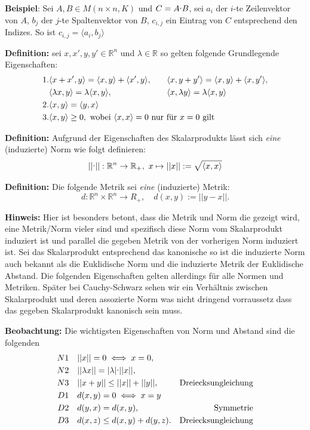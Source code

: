 \documentclass{article}
\let\oldcdot\cdot
\renewcommand{\cdot}{\raisebox{0.1ex}{$\oldcdot$}}
\begin{document}
\textbf{Beispiel}: Sei $A,B\in M(n\times n,K)$ und $C=A\cdot B$, sei $a_i$ der
$i$-te Zeilenvektor von $A$, $b_j$ der $j$-te Spaltenvektor von $B$, $c_{i,j}$
ein Eintrag von $C$ entsprechend den Indizes. So ist $c_{i,j}=\langle
a_i,b_j\rangle$

\textbf{Definition: } sei $x,x',y,y'\in\mathbb{R}^n$ und $\lambda\in\mathbb{R}$
so gelten folgende Grundlegende Eigenschaften:
\begin{alignat*}{2}
	1.&\langle x+x',y\rangle = \langle x,y\rangle + \langle
	x',y\rangle,\quad&&
	\langle x,y+y'\rangle = \langle x,y\rangle + \langle x,y'\rangle,\\
	&\langle \lambda x,y\rangle=\lambda\langle x,y\rangle,&&
	\langle x,\lambda y\rangle=\lambda\langle x,y\rangle\\
	2.&\langle x,y\rangle = \langle y,x\rangle\\
	3.&\mathrlap{\langle x,y\rangle \geq0,\text{ wobei }\langle x,x\rangle
	=0\text{ nur für $x=0$ gilt}}
\end{alignat*}

\textbf{Definition:} Aufgrund der Eigenschaften des Skalarprodukts lässt sich
\textit{eine} (induzierte) Norm wie folgt definieren:
\begin{equation*}
||\cdot||:\mathbb{R}^n\to\mathbb{R}_+,\ x\mapsto||x||:=\sqrt{\langle
x,x\rangle}
\end{equation*}

\textbf{Definition:} Die folgende Metrik sei \textit{eine} (induzierte) Metrik:
\begin{equation*}
	d:\mathbb{R}^n\times \mathbb{R}^n\to R_+,\quad d(x,y):=||y-x||.
\end{equation*}

\textbf{Hinweis:} Hier ist besonders betont, dass die Metrik und Norm die
gezeigt wird, eine Metrik/Norm vieler sind und spezifisch diese Norm vom
Skalarprodukt induziert ist und parallel die gegeben Metrik von der vorherigen
Norm induziert ist. Sei das Skalarprodukt entsprechend das kanonische so ist
die induzierte Norm auch bekannt als die Euklidische Norm und die induzierte
Metrik der Euklidische Abstand. Die folgenden Eigenschaften gelten allerdings
für alle Normen und Metriken. Später bei Cauchy-Schwarz sehen wir ein
Verhältnis zwischen Skalarprodukt und deren assozierte Norm was nicht dringend
vorraussetz dass das gegeben Skalarprodukt kanonisch sein muss.

\textbf{Beobachtung:} Die wichtigsten Eigenschaften von Norm und Abstand sind
die folgenden
\begin{align*}
	N1\quad& ||x||=0\iff x=0,\\
	N2\quad& ||\lambda x||=|\lambda|\cdot ||x||,\\
	N3\quad& ||x+y||\leq ||x||+||y||, & \text{Dreiecksungleichung}\\
	D1\quad& d(x,y)=0\iff x=y\\
	D2\quad& d(y,x)=d(x,y), & \text{Symmetrie}\\
	D3\quad& d(x,z)\leq d(x,y)+d(y,z). & \text{Dreiecksungleichung}
\end{align*}
\end{document}
